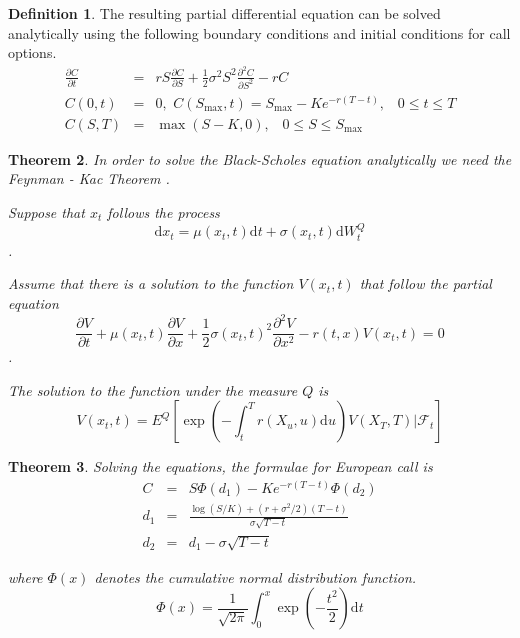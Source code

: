 \documentclass[12pt, oneside]{book}
\theoremstyle{plain}
\newtheorem{theorem}{Theorem}[section]
\theoremstyle{definition}
\newtheorem{definition}[theorem]{Definition}
\begin{document}
\begin{definition}\label{bsBase} The resulting partial differential equation can be solved analytically using the following boundary conditions and initial conditions for call options.
\begin{eqnarray}
\frac{\partial C}{\partial t} &=& rS\frac{\partial C}{\partial S}+\frac{1}{2} \sigma^2 S^2 \frac{\partial^2 C}{\partial S^2} - rC \\[10pt]
C(0,t) &=& 0, \hspace{4pt} C(S_{\max},t)=S_{\max} - K e^{-r(T-t)}, \hspace{10pt} 0 \leq t \leq T \\[10pt]
C(S,T) &=& \max(S-K,0), \hspace{10pt} 0 \leq S \leq S_{\max}
\end{eqnarray}
\end{definition}

\begin{theorem}\label{Feynman}
In order to solve the Black-Scholes equation analytically we need the Feynman - Kac Theorem \cite{klebaner}.

Suppose that $x_t$ follows the process
\begin{equation}
\mathrm{d} x_t = \mu(x_t, t)  \mathrm{d}t + \sigma(x_t, t) \mathrm{d} W_t^Q
\end{equation}.

Assume that there is a solution to the function $V(x_t, t)$ that follow the partial equation
\begin{equation}
\frac{\partial V}{\partial t} +  \mu(x_t, t) \frac{\partial V}{\partial x} + \frac{1}{2} \sigma(x_t, t)^2 \frac{\partial^2 V}{\partial x^2} - r(t, x) V(x_t, t) = 0
\end{equation}.

The solution to the function under the measure $Q$ is
\begin{equation}
V(x_t, t) = E^Q [ \exp(-  \int_{t}^{T} r(X_u, u)  \mathrm{d}u) V(X_T, T) \lvert \mathcal{F}_t]
\end{equation}

\end{theorem}

\begin{theorem}\label{bsAnal} 
Solving the equations, the formulae \cite{wilmott} for European call is
\begin{eqnarray}
C &=& S \Phi (d_1) - K e^{-r(T-t)} \Phi (d_2) \\[10pt]
d_1 &=& \frac{\log(S/K) + (r + \sigma^2/2)(T - t)}{\sigma \sqrt{T-t}} \\[10pt]
d_2 &=& d_1 - \sigma \sqrt{T-t}
\end{eqnarray}

where $\Phi(x)$ denotes the cumulative normal distribution function.
\begin{equation}
\Phi(x) = \frac{1}{\sqrt{2 \pi}} \int_0^x \exp (-\frac{t^2}{2}) \mathrm{d}t
\end{equation}
\end{theorem}
\end{document}
